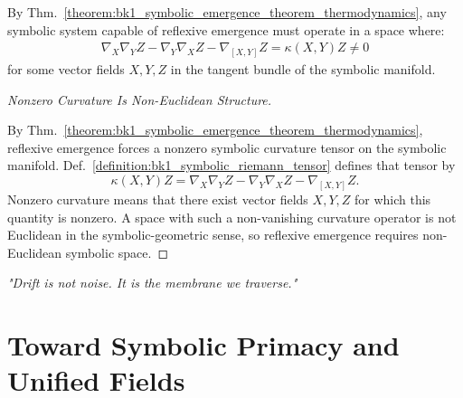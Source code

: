 \begin{corollary}
\label{corollary:bk1_necessity_of_non_euclidean_symbolic_space}
By Thm.~\ref{theorem:bk1_symbolic_emergence_theorem_thermodynamics}, any symbolic system capable of reflexive emergence must operate in a space where:
\begin{align}
\nabla_X \nabla_Y Z - \nabla_Y \nabla_X Z - \nabla_{[X,Y]}Z = \kappa(X,Y)Z \neq 0
\end{align}
for some vector fields $X, Y, Z$ in the tangent bundle of the symbolic manifold.
\end{corollary}
\begin{proof}[Nonzero Curvature Is Non-Euclidean Structure]
\label{proof:bk1_necessity_of_non_euclidean_symbolic_space}
\leavevmode

By Thm.~\ref{theorem:bk1_symbolic_emergence_theorem_thermodynamics}, reflexive
emergence forces a nonzero symbolic curvature tensor on the symbolic manifold.
Def.~\ref{definition:bk1_symbolic_riemann_tensor} defines that tensor by
\[
\kappa(X,Y)Z=\nabla_X\nabla_YZ-\nabla_Y\nabla_XZ-\nabla_{[X,Y]}Z .
\]
Nonzero curvature means that there exist vector fields \(X,Y,Z\) for which this
quantity is nonzero. A space with such a non-vanishing curvature operator is not
Euclidean in the symbolic-geometric sense, so reflexive emergence requires
non-Euclidean symbolic space.
\end{proof}
\begin{flushright}
\textit{"Drift is not noise. It is the membrane we traverse."}
\end{flushright}
\section{Toward Symbolic Primacy and Unified Fields}
\label{sec:bk1_toward_symbolic_primacy_and_unified_fields}
